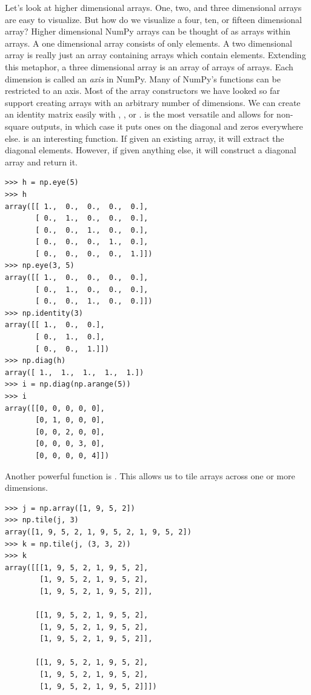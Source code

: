 Let's look at higher dimensional arrays.
One, two, and three dimensional arrays are easy to visualize.
But how do we visualize a four, ten, or fifteen dimensional array?
Higher dimensional NumPy arrays can be thought of as arrays within arrays.
A one dimensional array consists of only elements.
A two dimensional array is really just an array containing arrays which contain elements.
Extending this metaphor, a three dimensional array is an array of arrays of arrays.
Each dimension is called an \emph{axis} in NumPy.  Many of NumPy's functions can be restricted to an axis.
Most of the array constructors we have looked so far support creating arrays with an arbitrary number of dimensions.
We can create an identity matrix easily with , , or .
 is the most versatile and allows for non-square outputs, in which case it puts ones on the diagonal and zeros everywhere else.
 is an interesting function.  If given an existing array, it will extract the diagonal elements.
However, if given anything else, it will construct a diagonal array and return it.
\begin{lstlisting}
>>> h = np.eye(5)
>>> h
array([[ 1.,  0.,  0.,  0.,  0.],
       [ 0.,  1.,  0.,  0.,  0.],
       [ 0.,  0.,  1.,  0.,  0.],
       [ 0.,  0.,  0.,  1.,  0.],
       [ 0.,  0.,  0.,  0.,  1.]])
>>> np.eye(3, 5)
array([[ 1.,  0.,  0.,  0.,  0.],
       [ 0.,  1.,  0.,  0.,  0.],
       [ 0.,  0.,  1.,  0.,  0.]])
>>> np.identity(3)
array([[ 1.,  0.,  0.],
       [ 0.,  1.,  0.],
       [ 0.,  0.,  1.]])
>>> np.diag(h)
array([ 1.,  1.,  1.,  1.,  1.])
>>> i = np.diag(np.arange(5))
>>> i
array([[0, 0, 0, 0, 0],
       [0, 1, 0, 0, 0],
       [0, 0, 2, 0, 0],
       [0, 0, 0, 3, 0],
       [0, 0, 0, 0, 4]])
\end{lstlisting}
Another powerful function is .
This allows us to tile arrays across one or more dimensions.
\begin{lstlisting}
>>> j = np.array([1, 9, 5, 2])
>>> np.tile(j, 3)
array([1, 9, 5, 2, 1, 9, 5, 2, 1, 9, 5, 2])
>>> k = np.tile(j, (3, 3, 2))
>>> k
array([[[1, 9, 5, 2, 1, 9, 5, 2],
        [1, 9, 5, 2, 1, 9, 5, 2],
        [1, 9, 5, 2, 1, 9, 5, 2]],

       [[1, 9, 5, 2, 1, 9, 5, 2],
        [1, 9, 5, 2, 1, 9, 5, 2],
        [1, 9, 5, 2, 1, 9, 5, 2]],

       [[1, 9, 5, 2, 1, 9, 5, 2],
        [1, 9, 5, 2, 1, 9, 5, 2],
        [1, 9, 5, 2, 1, 9, 5, 2]]])
\end{lstlisting}

